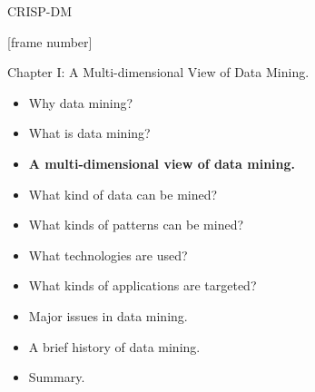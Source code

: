 \documentclass[aspectratio=169,t]{beamer}
\begin{document}
{\begin{frame}{CRISP-DM}
    \end{frame}
  }

  {
    [frame number]
    \begin{frame}{Chapter I: A Multi-dimensional View of Data Mining.}
        \begin{itemize}
            \item Why data mining?
            \item What is data mining?
            \item \textbf{A multi-dimensional view of data mining.}
            \item What kind of data can be mined?
            \item What kinds of patterns can be mined?
            \item What technologies are used?
            \item What kinds of applications are targeted?
            \item Major issues in data mining.
            \item A brief history of data mining.
            \item Summary.
        \end{itemize}
    \end{frame}
  }
\end{document}
